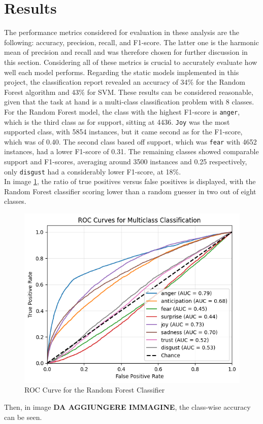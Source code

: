 \chapter*{Results}
\label{ch:results}
The performance metrics considered for evaluation in these analysis are the following: accuracy, precision,
recall, and F1-score. The latter one is the harmonic mean of precision and recall and was therefore chosen for further discussion in this section. Considering all of these metrics is crucial to accurately evaluate how well each
model performs.
Regarding the static models implemented in this project, the classification report revealed an accuracy of
34\% for the Random Forest algorithm and 43\% for SVM. These results can be considered reasonable, given that the task at hand is a multi-class classification problem with 8 classes.\\

For the Random Forest model, the class with the highest F1-score is \texttt{anger}, which is the third class as for support, sitting at 4436. 
\texttt{Joy} was the most supported class, with 5854 instances, but it came second as for the F1-score, which was of 0.40. The second class based off support, which was \texttt{fear} with 4652 instances, had a lower F1-score of 0.31. 
The remaining classes showed comparable support and F1-scores, averaging around 3500 instances and 0.25 respectively, only \texttt{disgust} had a considerably lower F1-score, at 18\%. \\
In image \ref{fig:roc_rf}, the ratio of true positives versus false positives is displayed, with the Random Forest classifier scoring lower than a random guesser in two out of eight classes. \\
\begin{figure}
    \centering
    \includegraphics[width=0.5\linewidth]{pictures/roc_rf.png}
    \caption{ROC Curve for the Random Forest Classifier}
    \label{fig:roc_rf}
\end{figure}
Then, in image \textbf{DA AGGIUNGERE IMMAGINE}, the class-wise accuracy can be seen. \\

